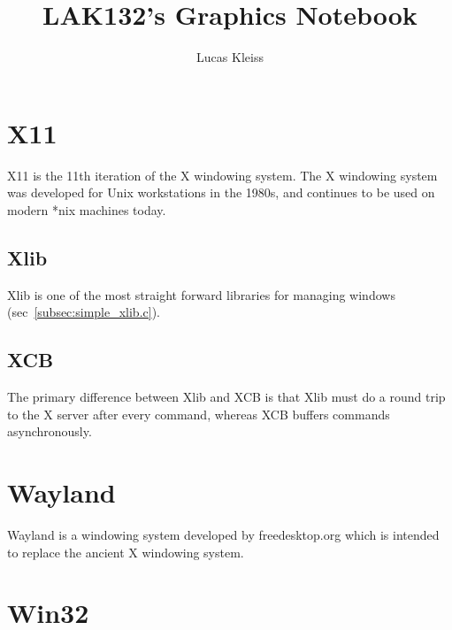 \documentclass{article}
\title{LAK132's Graphics Notebook}
\author{Lucas Kleiss}
\begin{document}
\maketitle

\tableofcontents


\section{X11}
\label{sec:x11}

X11 is the 11th iteration of the X windowing system.
The X windowing system was developed for Unix workstations in the 1980s,
and continues to be used on modern *nix machines today.

\subsection{Xlib}
\label{subsec:xlib}

Xlib is one of the most straight forward libraries for managing windows
(sec~\ref{subsec:simple_xlib.c}).

\subsection{XCB}
\label{subsec:xcb}

The primary difference between Xlib and XCB is that Xlib must do a round trip
to the X server after every command,
whereas XCB buffers commands asynchronously.


\section{Wayland}
\label{sec:wayland}

Wayland is a windowing system developed by freedesktop.org which is intended to
replace the ancient X windowing system.


\section{Win32}
\label{sec:win32}
\end{document}
